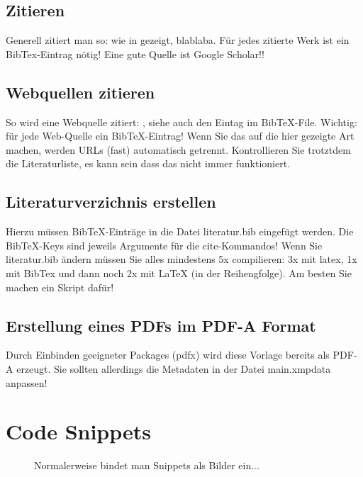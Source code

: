 \documentclass[12pt,oneside]{article}
\begin{document}
\subsection{Zitieren}\label{sec:zitate}
Generell zitiert man so: wie in \cite{clemen1989combining} gezeigt, blablaba. Für jedes zitierte Werk ist ein BibTex-Eintrag nötig! Eine gute Quelle ist Google Scholar!!

\subsection{Webquellen zitieren}\label{sec:webquellen}
So wird eine Webquelle zitiert: \cite{shiny1}, siehe auch den Eintag im BibTeX-File.
Wichtig: für jede Web-Quelle ein BibTeX-Eintrag! Wenn Sie das auf die hier gezeigte Art machen, werden URLs (fast) automatisch getrennt. Kontrollieren Sie trotztdem die Literaturliste, es kann sein dass das nicht immer funktioniert.

\subsection{Literaturverzichnis erstellen}
Hierzu müssen BibTeX-Einträge in die Datei literatur.bib eingefügt werden. Die BibTeX-Keys sind jeweils Argumente für die cite-Kommandos! Wenn Sie literatur.bib ändern müssen Sie alles mindestens 5x compilieren: 3x mit latex, 1x mit BibTex und dann noch 2x mit LaTeX (in der Reihengfolge). Am besten Sie machen ein Skript dafür!

\subsection{Erstellung eines PDFs im PDF-A Format}
Durch Einbinden geeigneter Packages (pdfx) wird diese Vorlage bereits als PDF-A erzeugt. Sie sollten allerdings die Metadaten in der Datei main.xmpdata anpassen!

\clearpage



\appendix
\section{Code Snippets}
\begin{figure}
    \centering
    \caption{Normalerweise bindet man Snippets als Bilder ein...\label{Snippet}
    }
\end{figure}
\end{document}
